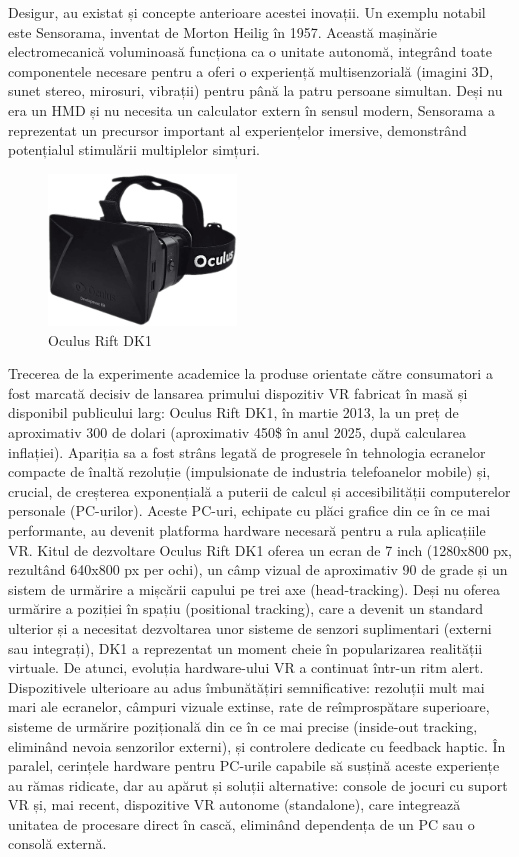Desigur, au existat și concepte anterioare acestei inovații. Un exemplu notabil este Sensorama, inventat de Morton Heilig în 1957. Această mașinărie electromecanică voluminoasă funcționa ca o unitate autonomă, integrând toate componentele necesare pentru a oferi o experiență multisenzorială (imagini 3D, sunet stereo, mirosuri, vibrații) pentru până la patru persoane simultan. 
Deși nu era un HMD și nu necesita un calculator extern în sensul modern, Sensorama a reprezentat un precursor important al experiențelor imersive, demonstrând potențialul stimulării multiplelor simțuri.
\begin{figure}
    \centering
    \includegraphics[width=5cm]{continut/capitol2/figuri/oculusriftdk1.png}
    \caption{Oculus Rift DK1}
    \label{fig:Oculus_DK1}
\end{figure}
Trecerea de la experimente academice la produse orientate către consumatori a fost marcată decisiv de lansarea primului dispozitiv VR fabricat în masă și disponibil publicului larg: Oculus Rift DK1, în martie 2013, la un preț de aproximativ 300 de dolari (aproximativ 450\$ în anul 2025, după calcularea inflației). Apariția sa a fost strâns legată de progresele în tehnologia ecranelor compacte de înaltă rezoluție (impulsionate de industria telefoanelor mobile) și, crucial, de creșterea exponențială a puterii de calcul și accesibilității computerelor personale (PC-urilor). 
Aceste PC-uri, echipate cu plăci grafice din ce în ce mai performante, au devenit platforma hardware necesară pentru a rula aplicațiile VR. Kitul de dezvoltare Oculus Rift DK1 oferea un ecran de 7 inch (1280x800 px, rezultând 640x800 px per ochi), un câmp vizual de aproximativ 90 de grade și un sistem de urmărire a mișcării capului pe trei axe (head-tracking). Deși nu oferea urmărire a poziției în spațiu (positional tracking), care a devenit un standard ulterior și a necesitat dezvoltarea unor sisteme de senzori suplimentari (externi sau integrați), DK1 a reprezentat un moment cheie în popularizarea realității virtuale.
De atunci, evoluția hardware-ului VR a continuat într-un ritm alert.
Dispozitivele ulterioare au adus îmbunătățiri semnificative: rezoluții mult mai mari ale ecranelor, câmpuri vizuale extinse, rate de reîmprospătare superioare, sisteme de urmărire pozițională din ce în ce mai precise (inside-out tracking, eliminând nevoia senzorilor externi), și controlere dedicate cu feedback haptic. În paralel, cerințele hardware pentru PC-urile capabile să susțină aceste experiențe au rămas ridicate, dar au apărut și soluții alternative: console de jocuri cu suport VR și, mai recent, dispozitive VR autonome (standalone), care integrează unitatea de procesare direct în cască, eliminând dependența de un PC sau o consolă externă.

